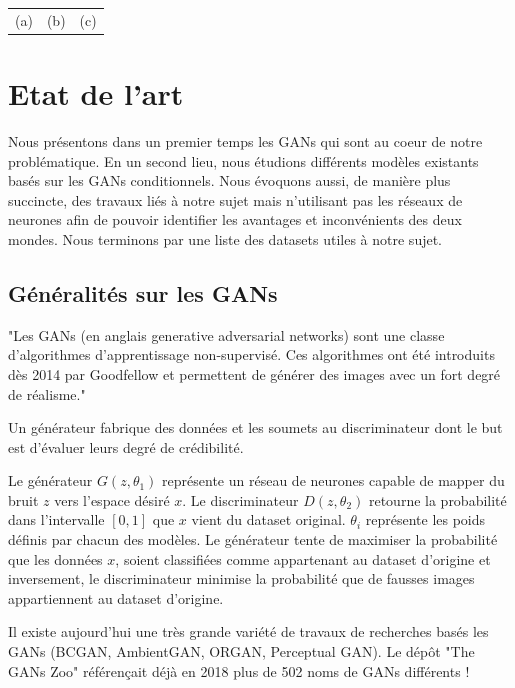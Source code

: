 \documentclass[a4paper, 12pt]{report}
\begin{document}
\begin{center}
\begin{tabular}{ccc}
    (a)&(b)&(c)
  \end{tabular}
\end{center}



\chapter{Etat de l'art}
 
Nous présentons dans un premier temps les GANs qui sont au coeur de notre problématique. En un second lieu, nous étudions différents modèles existants basés sur les GANs conditionnels. Nous évoquons aussi, de manière plus succincte, des travaux liés à notre sujet mais n'utilisant pas les réseaux de neurones afin de pouvoir identifier les avantages et inconvénients des deux mondes. Nous terminons par une liste des datasets utiles à notre sujet.


\section{Généralités sur les GANs}

"Les GANs (en anglais generative adversarial networks) sont une classe d'algorithmes d'apprentissage non-supervisé. Ces algorithmes ont été introduits dès 2014 par Goodfellow et permettent de générer des images avec un fort degré de réalisme." \cite{wiki:Reseaux-antagonistes-generatifs}

Un générateur fabrique des données et les soumets au discriminateur dont le but est d'évaluer leurs degré de crédibilité. 

Le générateur $G(z, \theta_{1})$ représente un réseau de neurones capable de mapper du bruit $z$ vers l'espace désiré $x$. Le discriminateur $D(z, \theta_{2})$ retourne la probabilité dans l'intervalle $[0,1]$ que $x$ vient du dataset original. $\theta_{i}$ représente les poids définis par chacun des modèles. Le générateur tente de maximiser la probabilité que les données $x$, soient classifiées comme appartenant au dataset d'origine et inversement, le discriminateur minimise la probabilité que de fausses images appartiennent au dataset d'origine.

Il existe aujourd'hui une très grande variété de travaux de recherches basés les GANs (BCGAN, AmbientGAN, ORGAN, Perceptual GAN). Le dépôt "The GANs Zoo" \cite{hindupuravinash} référençait déjà en 2018 plus de 502 noms de GANs différents !
\end{document}
